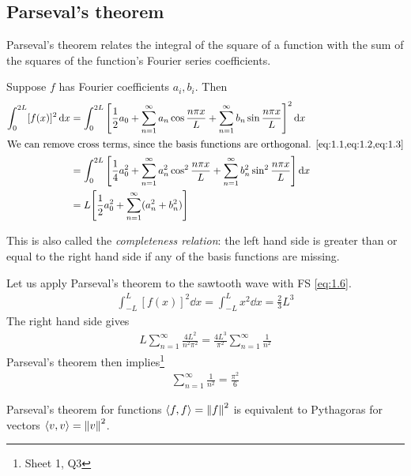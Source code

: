     \subsection{Parseval's theorem}
    Parseval's theorem relates the integral of the square of a function with the sum of the squares of the function's Fourier series coefficients.
    \begin{theorem}
        Suppose $f$ has Fourier coefficients $a_i, b_i$.
        Then
        \begin{align}
            \int_0^{2L} [f(x)]^2 \dd{x} & = \int_0^{2L} \qty[ \frac{1}{2}a_0 + \sum_{n=1}^\infty a_n \cos \frac{n \pi x}{L} + \sum_{n=1}^\infty b_n \sin \frac{n\pi x}{L} ]^2 \dd{x} \notag \\
            \intertext{We can remove cross terms, since the basis functions are orthogonal. \cref{eq:1.1,eq:1.2,eq:1.3}}
            & = \int_0^{2L} \qty[ \frac{1}{4} a_0^2 + \sum_{n=1}^\infty a_n^2 \cos^2 \frac{n\pi x}{L} + \sum_{n=1}^\infty b_n^2 \sin^2 \frac{n\pi x}{L} ] \dd{x} \notag \\
            & = L \qty[ \frac{1}{2} a_0^2 + \sum_{n=1}^\infty (a_n^2 + b_n^2) ] \label{eq:1.10}
        \end{align}
    \end{theorem}
    \noindent This is also called the \textit{completeness relation}: the left hand side is greater than or equal to the right hand side if any of the basis functions are missing.
    \begin{example}
        Let us apply Parseval's theorem to the sawtooth wave with FS \cref{eq:1.6}.
        \begin{align*}
            \int_{-L}^L [f(x)]^2 \dd{x} = \int_{-L}^L x^2 \dd{x} = \frac{2}{3}L^3
        \end{align*}
        The right hand side gives
        \begin{align*}
            L \sum_{n=1}^\infty \frac{4L^2}{n^2 \pi^2} = \frac{4 L^3}{\pi^2} \sum_{n=1}^\infty \frac{1}{n^2}
        \end{align*}
        Parseval's theorem then implies\footnote{Sheet 1, Q3}
        \begin{align*}
            \sum_{n=1}^\infty \frac{1}{n^2} = \frac{\pi^2}{6}
        \end{align*}
    \end{example}
    \begin{note}
        Parseval's theorem for functions $\left\langle{f, f}\right\rangle = \left \lVert f \right \rVert^2$ is equivalent to Pythagoras for vectors $\left\langle{v, v}\right\rangle = \left \lVert v \right \rVert^2$.
    \end{note} 

